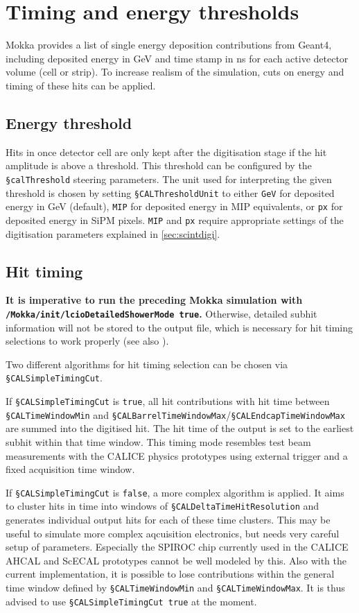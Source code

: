 \documentclass[12pt]{article} %
\begin{document}
\section{Timing and energy thresholds}
Mokka provides a list of single energy deposition contributions from Geant4, including deposited energy in GeV and time stamp in ns for each active detector volume (cell or strip). To increase realism of the simulation, cuts on energy and timing of these hits can be applied.

\subsection{Energy threshold}
Hits in once detector cell are only kept after the digitisation stage if the hit amplitude is above a threshold. This threshold can be configured by the {\tt \S calThreshold} steering parameters.
The unit used for interpreting the given threshold is chosen by setting {\tt \S CALThresholdUnit} to either
{\tt GeV} for deposited energy in GeV (default),
{\tt MIP} for deposited energy in MIP equivalents, or
{\tt px} for deposited energy in SiPM pixels.
{\tt MIP} and {\tt px} require appropriate settings of the digitisation parameters explained in \autoref{sec:scintdigi}.

\subsection{Hit timing}
\textbf{It is imperative to run the preceding Mokka simulation with {\tt /Mokka/init/lcioDetailedShowerMode true}.}
Otherwise, detailed subhit information will not be stored to the output file, which is necessary for hit timing
selections to work properly (see also \cite{SG_HcalOpt}).

Two different algorithms for hit timing selection can be chosen via {\tt \S CALSimpleTimingCut}.

If {\tt \S CALSimpleTimingCut} is {\tt true}, all hit contributions with hit time between
{\tt \S CALTimeWindowMin} and {\tt \S CALBarrelTimeWindowMax}/{\tt \S CALEndcapTimeWindowMax}
are summed into the digitised hit. The hit time of the output is set to the earliest subhit
within that time window. This timing mode resembles test beam measurements with the CALICE
physics prototypes using external trigger and a fixed acquisition time window.

If {\tt \S CALSimpleTimingCut} is {\tt false}, a more complex algorithm is applied.
It aims to cluster hits in time into windows of {\tt \S CALDeltaTimeHitResolution}
and generates individual output hits for each of these time clusters. This may be useful
to simulate more complex aqcuisition electronics, but needs very careful setup of parameters.
Especially the SPIROC chip currently used in the CALICE AHCAL and ScECAL prototypes cannot be well
modeled by this. Also with the current implementation, it is possible to lose contributions
within the general time window defined by {\tt \S CALTimeWindowMin} and {\tt \S CALTimeWindowMax}.
It is thus advised to use {\tt \S CALSimpleTimingCut true} at the moment.
\end{document}
